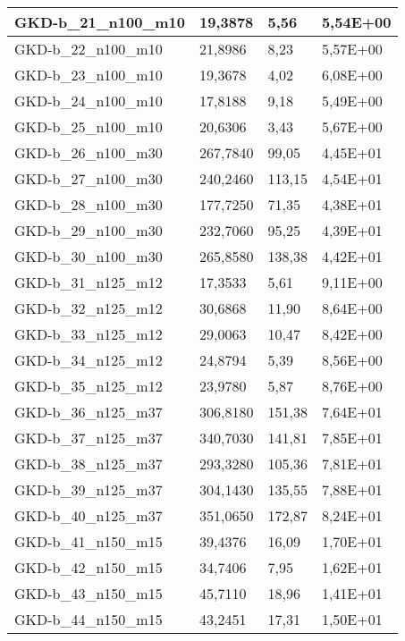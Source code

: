 \begin{table}[!ht]
\begin{adjustbox}{height=12cm}
\begin{tabular}{|l|l|l|l|}
		GKD-b\_21\_n100\_m10 & 19,3878  & 5,56           & 5,54E+00 \\ \hline
		GKD-b\_22\_n100\_m10 & 21,8986  & 8,23           & 5,57E+00 \\ \hline
		GKD-b\_23\_n100\_m10 & 19,3678  & 4,02           & 6,08E+00 \\ \hline
		GKD-b\_24\_n100\_m10 & 17,8188  & 9,18           & 5,49E+00 \\ \hline
		GKD-b\_25\_n100\_m10 & 20,6306  & 3,43           & 5,67E+00 \\ \hline
		GKD-b\_26\_n100\_m30 & 267,7840 & 99,05          & 4,45E+01 \\ \hline
		GKD-b\_27\_n100\_m30 & 240,2460 & 113,15         & 4,54E+01 \\ \hline
		GKD-b\_28\_n100\_m30 & 177,7250 & 71,35          & 4,38E+01 \\ \hline
		GKD-b\_29\_n100\_m30 & 232,7060 & 95,25          & 4,39E+01 \\ \hline
		GKD-b\_30\_n100\_m30 & 265,8580 & 138,38         & 4,42E+01 \\ \hline
		GKD-b\_31\_n125\_m12 & 17,3533  & 5,61           & 9,11E+00 \\ \hline
		GKD-b\_32\_n125\_m12 & 30,6868  & 11,90          & 8,64E+00 \\ \hline
		GKD-b\_33\_n125\_m12 & 29,0063  & 10,47          & 8,42E+00 \\ \hline
		GKD-b\_34\_n125\_m12 & 24,8794  & 5,39           & 8,56E+00 \\ \hline
		GKD-b\_35\_n125\_m12 & 23,9780  & 5,87           & 8,76E+00 \\ \hline
		GKD-b\_36\_n125\_m37 & 306,8180 & 151,38         & 7,64E+01 \\ \hline
		GKD-b\_37\_n125\_m37 & 340,7030 & 141,81         & 7,85E+01 \\ \hline
		GKD-b\_38\_n125\_m37 & 293,3280 & 105,36         & 7,81E+01 \\ \hline
		GKD-b\_39\_n125\_m37 & 304,1430 & 135,55         & 7,88E+01 \\ \hline
		GKD-b\_40\_n125\_m37 & 351,0650 & 172,87         & 8,24E+01 \\ \hline
		GKD-b\_41\_n150\_m15 & 39,4376  & 16,09          & 1,70E+01 \\ \hline
		GKD-b\_42\_n150\_m15 & 34,7406  & 7,95           & 1,62E+01 \\ \hline
		GKD-b\_43\_n150\_m15 & 45,7110  & 18,96          & 1,41E+01 \\ \hline
		GKD-b\_44\_n150\_m15 & 43,2451  & 17,31          & 1,50E+01 \\ \hline

\end{tabular}
\end{adjustbox}
\end{table}
